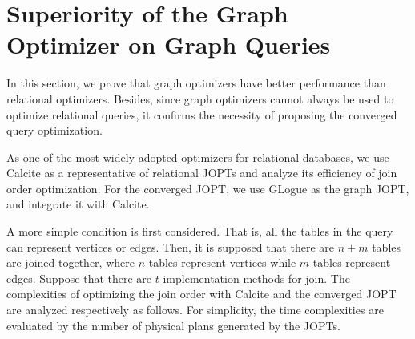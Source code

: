 \section{Superiority of the Graph Optimizer on Graph Queries}
\label{sec:theoretical-analysis}

In this section, we prove that graph optimizers have better performance than relational optimizers.
Besides, since graph optimizers cannot always be used to optimize relational queries, it confirms the necessity of proposing the converged query optimization.

As one of the most widely adopted optimizers for relational databases, we use Calcite \cite{calcite,columbia} as a representative of relational JOPTs and analyze its efficiency of join order optimization.
For the converged JOPT, we use GLogue \cite{GLogS} as the graph JOPT, and integrate it with Calcite.

A more simple condition is first considered.
That is, all the tables in the query can represent vertices or edges.
Then, it is supposed that there are $n + m$ tables are joined together, where $n$ tables represent vertices while $m$ tables represent edges.
Suppose that there are $t$ implementation methods for join.
The complexities of optimizing the join order with Calcite and the converged JOPT are analyzed respectively as follows.
For simplicity, the time complexities are evaluated by the number of physical plans generated by the JOPTs.

